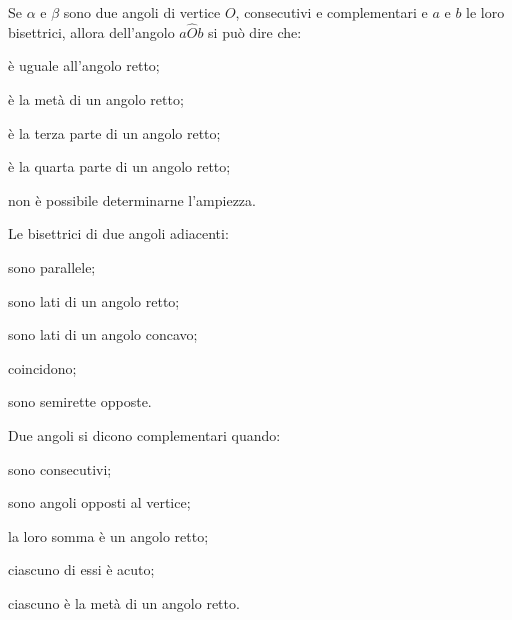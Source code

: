 \begin{esercizio}
\label{ese:1.68}
Se \(\alpha\) e \(\beta\) sono due angoli di vertice \(O\), consecutivi e 
complementari e \(a\) e \(b\) le loro bisettrici, allora dell'angolo 
\(a\widehat{O}b\) si può dire  che:
\begin{multicols}{2}
\begin{enumeratea}
\item è uguale all'angolo retto;
\item è la metà di un angolo retto;
\item è la terza parte di un angolo retto;
\item è la quarta parte di un angolo retto;
\item non è possibile determinarne l'ampiezza.
\end{enumeratea}
\end{multicols}
\end{esercizio}

\begin{esercizio}
\label{ese:1.69}
Le bisettrici di due angoli adiacenti:
\begin{multicols}{2}
\begin{enumeratea}
\item sono parallele;
\item sono lati di un angolo retto;
\item sono lati di un angolo concavo;
\item coincidono;
\item sono semirette opposte.
\end{enumeratea}
\end{multicols}
\end{esercizio}

\begin{esercizio}
\label{ese:1.70}
Due angoli si dicono complementari quando:
\begin{multicols}{2}
\begin{enumeratea}
\item sono consecutivi;
\item sono angoli opposti al vertice;
\item la loro somma è un angolo retto;
\item ciascuno di essi è acuto;
\item ciascuno è la metà di un angolo retto.
\end{enumeratea}
\end{multicols}
\end{esercizio}

